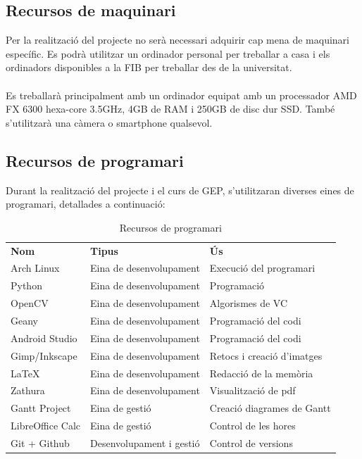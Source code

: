 	\subsection{Recursos de maquinari}
		Per la realització del projecte no serà necessari adquirir cap mena de maquinari específic. Es podrà utilitzar un ordinador personal per treballar a casa i els ordinadors disponibles a la FIB per
		treballar des de la universitat.\\\\
		Es treballarà principalment amb un ordinador equipat amb un processador AMD FX 6300 hexa-core 3.5GHz, 4GB de RAM i 250GB de disc dur SSD. També s'utilitzarà una càmera o smartphone qualsevol.
	\subsection{Recursos de programari}
	Durant la realització del projecte i el curs de GEP, s'utilitzaran diverses eines de programari, detallades a continuació:\\
	\begin{table}[H]
		\begin{center}
			\begin{tabular}{l !{\vrule width -1pt}p{5cm} !{\vrule width -1pt}p{5cm}}
			\textbf{Nom} & \textbf{Tipus} & \textbf{Ús} \\
			Arch Linux & Eina de desenvolupament & Execució del programari \\
			Python & Eina de desenvolupament & Programació \\
			OpenCV & Eina de desenvolupament & Algorismes de VC \\
			Geany & Eina de desenvolupament & Programació del codi \\
			Android Studio & Eina de desenvolupament & Programació del codi \\
			Gimp/Inkscape & Eina de desenvolupament & Retocs i creació d'imatges \\
			\LaTeX & Eina de desenvolupament & Redacció de la memòria \\
			Zathura & Eina de desenvolupament & Visualització de pdf \\
			Gantt Project & Eina de gestió & Creació diagrames de Gantt \\
			LibreOffice Calc & Eina de gestió & Control de les hores \\
			Git + Github & Desenvolupament i gestió & Control de versions \\
			\end{tabular}
		\end{center}
		\caption{Recursos de programari}
		\label{table:programari}
	\end{table}
	
